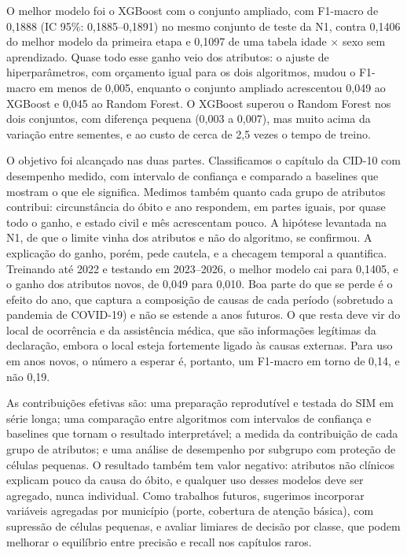 \documentclass[12pt]{article}
\begin{document}
O melhor modelo foi o XGBoost com o conjunto ampliado, com F1-macro de 0,1888 (IC 95\%: 0,1885--0,1891) no mesmo conjunto de teste da N1, contra 0,1406 do melhor modelo da primeira etapa e 0,1097 de uma tabela idade $\times$ sexo sem aprendizado. Quase todo esse ganho veio dos atributos: o ajuste de hiperparâmetros, com orçamento igual para os dois algoritmos, mudou o F1-macro em menos de 0,005, enquanto o conjunto ampliado acrescentou 0,049 ao XGBoost e 0,045 ao Random Forest. O XGBoost superou o Random Forest nos dois conjuntos, com diferença pequena (0,003 a 0,007), mas muito acima da variação entre sementes, e ao custo de cerca de 2,5 vezes o tempo de treino.

O objetivo foi alcançado nas duas partes. Classificamos o capítulo da CID-10 com desempenho medido, com intervalo de confiança e comparado a baselines que mostram o que ele significa. Medimos também quanto cada grupo de atributos contribui: circunstância do óbito e ano respondem, em partes iguais, por quase todo o ganho, e estado civil e mês acrescentam pouco. A hipótese levantada na N1, de que o limite vinha dos atributos e não do algoritmo, se confirmou. A explicação do ganho, porém, pede cautela, e a checagem temporal a quantifica. Treinando até 2022 e testando em 2023--2026, o melhor modelo cai para 0,1405, e o ganho dos atributos novos, de 0,049 para 0,010. Boa parte do que se perde é o efeito do ano, que captura a composição de causas de cada período (sobretudo a pandemia de COVID-19) e não se estende a anos futuros. O que resta deve vir do local de ocorrência e da assistência médica, que são informações legítimas da declaração, embora o local esteja fortemente ligado às causas externas. Para uso em anos novos, o número a esperar é, portanto, um F1-macro em torno de 0,14, e não 0,19.

As contribuições efetivas são: uma preparação reprodutível e testada do SIM em série longa; uma comparação entre algoritmos com intervalos de confiança e baselines que tornam o resultado interpretável; a medida da contribuição de cada grupo de atributos; e uma análise de desempenho por subgrupo com proteção de células pequenas. O resultado também tem valor negativo: atributos não clínicos explicam pouco da causa do óbito, e qualquer uso desses modelos deve ser agregado, nunca individual. Como trabalhos futuros, sugerimos incorporar variáveis agregadas por município (porte, cobertura de atenção básica), com supressão de células pequenas, e avaliar limiares de decisão por classe, que podem melhorar o equilíbrio entre precisão e recall nos capítulos raros.



\end{document}
